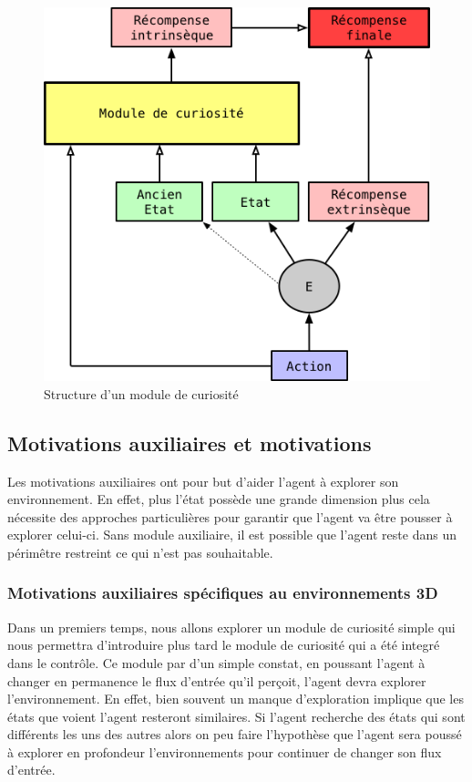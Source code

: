 \begin{figure}[h!]
\begin{center}
    \includegraphics[scale=.5]{./assets/CURIOSITY/curiosity.png}
    \caption{Structure d'un module de curiosité}
\end{center}
\end{figure}

\subsection{Motivations auxiliaires et motivations}

Les motivations auxiliaires ont pour but d'aider l'agent à explorer son environnement. En effet, plus l'état possède une grande dimension plus cela nécessite des approches particulières pour garantir que l'agent va être pousser à explorer celui-ci. Sans module auxiliaire, il est possible que l'agent reste dans un périmêtre restreint ce qui n'est pas souhaitable.

\subsubsection{Motivations auxiliaires spécifiques au environnements 3D}

Dans un premiers temps, nous allons explorer un module de curiosité simple qui nous permettra d'introduire plus tard le module de curiosité qui a été integré dans le contrôle. Ce module par d'un simple constat, en poussant l'agent à changer en permanence le flux d'entrée qu'il perçoit, l'agent devra explorer l'environnement. En effet, bien souvent un manque d'exploration implique que les états que voient l'agent resteront similaires. Si l'agent recherche des états qui sont différents les uns des autres alors on peu faire l'hypothèse que l'agent sera poussé à explorer en profondeur l'environnements pour continuer de changer son flux d'entrée.

